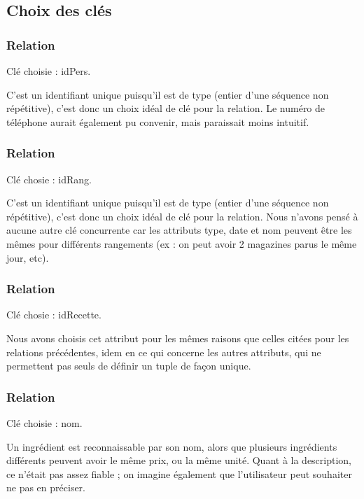 \documentclass[a4paper,10pt]{report}
\begin{document}
\subsection{Choix des clés}

 \subsubsection{Relation }
 	Clé choisie : idPers. 
 	
	C'est un identifiant unique puisqu'il est de type  (entier d'une séquence non répétitive), c'est donc un choix idéal de clé pour la relation. Le numéro de téléphone aurait également pu convenir, mais paraissait moins intuitif.\\
	
 \subsubsection{Relation }
 	Clé chosie : idRang.
 	
	C'est un identifiant unique puisqu'il est de type  (entier d'une séquence non répétitive), c'est donc un choix idéal de clé pour la relation. Nous n'avons pensé à aucune autre clé concurrente car les attributs type, date et nom peuvent être les mêmes pour différents rangements (ex : on peut avoir 2 magazines parus le même jour, etc).\\
	 
 \subsubsection{Relation }
 	Clé chosie : idRecette.
 	
	Nous avons choisis cet attribut pour les mêmes raisons que celles citées pour les relations précédentes, idem en ce qui concerne les autres attributs, qui ne permettent pas seuls de définir un tuple de façon unique.
	
 \subsubsection{Relation }
 	 Clé choisie : nom.
 	 
	 Un ingrédient est reconnaissable par son nom, alors que plusieurs ingrédients différents peuvent avoir le même prix, ou la même unité. Quant à la description, ce n'était pas assez fiable ; on imagine également que l'utilisateur peut souhaiter ne pas en préciser.\\
	 
\end{document}
